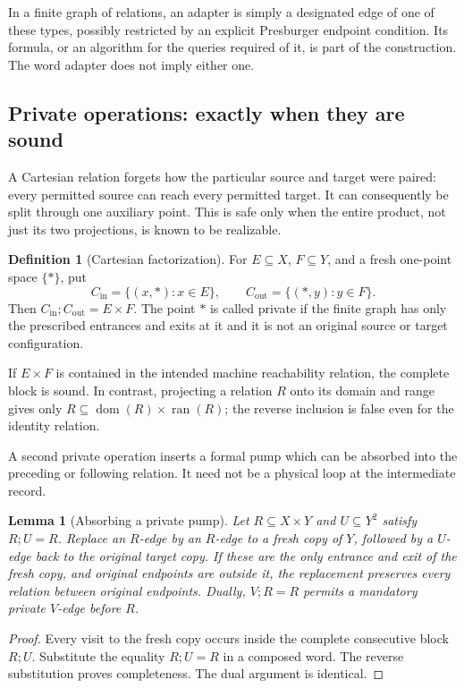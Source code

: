 \documentclass[11pt,a4paper]{article}
\newtheorem{lemma}[theorem]{Lemma}
\theoremstyle{definition}
\newtheorem{definition}[theorem]{Definition}
\theoremstyle{remark}
\begin{document}
In a finite graph of relations, an adapter is simply a designated
edge of one of these types, possibly restricted by an explicit
Presburger endpoint condition. Its formula, or an algorithm for the
queries required of it, is part of the construction. The word adapter
does not imply either one.

\subsection{Private operations: exactly when they are sound}

A Cartesian relation forgets how the particular source and target
were paired: every permitted source can reach every permitted target.
It can consequently be split through one auxiliary point. This is
safe only when the entire product, not just its two projections, is
known to be realizable.

\begin{definition}[Cartesian factorization]
\label{def:cartesian}
For \(E\subseteq X\), \(F\subseteq Y\), and a fresh one-point space
\(\{\ast\}\), put
\[
 C_{\mathrm{in}}=\{(x,\ast):x\in E\},\qquad
 C_{\mathrm{out}}=\{(\ast,y):y\in F\}.
\]
Then \(C_{\mathrm{in}};C_{\mathrm{out}}=E\times F\).
The point \(\ast\) is called private if the finite graph has only the
prescribed entrances and exits at it and it is not an original
source or target configuration.
\end{definition}

If \(E\times F\) is contained in the intended machine reachability
relation, the complete block is sound. In contrast, projecting a
relation \(R\) onto its domain and range gives only
\(R\subseteq\operatorname{dom}(R)\times\operatorname{ran}(R)\);
the reverse inclusion is false even for the identity relation.

A second private operation inserts a formal pump which can be
absorbed into the preceding or following relation. It need not be a
physical loop at the intermediate record.

\begin{lemma}[Absorbing a private pump]
\label{lem:private-pump}
Let \(R\subseteq X\times Y\) and \(U\subseteq Y^2\) satisfy
\(R;U=R\). Replace an \(R\)-edge by an \(R\)-edge to a fresh copy of
\(Y\), followed by a \(U\)-edge back to the original target copy.
If these are the only entrance and exit of the fresh copy, and
original endpoints are outside it, the replacement preserves every
relation between original endpoints.
Dually, \(V;R=R\) permits a mandatory private \(V\)-edge before \(R\).
\end{lemma}
\begin{proof}
Every visit to the fresh copy occurs inside the complete consecutive
block \(R;U\). Substitute the equality \(R;U=R\) in a composed word.
The reverse substitution proves completeness. The dual argument is
identical.
\end{proof}
\end{document}
